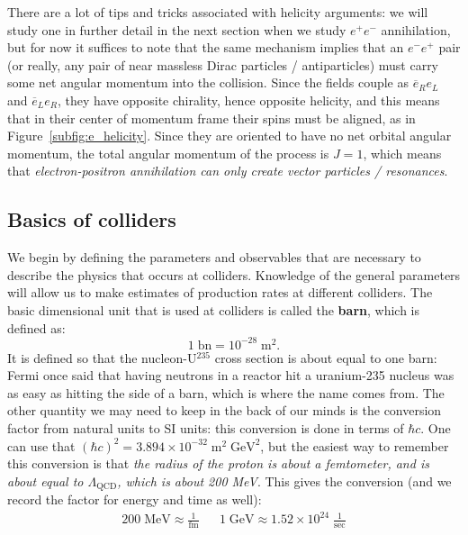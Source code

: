 \documentclass[11pt, oneside]{article}   	%
\theoremstyle{definition}
\numberwithin{equation}{subsection}		%
\begin{document}
There are a lot of tips and tricks associated with helicity arguments: we will study one in further detail in the next section when we study $e^+ e^-$ annihilation, but for now it suffices 
to note that the same mechanism implies that an $e^- e^+$ pair (or really, any pair of near massless Dirac particles / antiparticles) must carry some net angular momentum into 
the collision. Since the fields couple as $\overline e_R e_L$ and $\overline e_L e_R$, they have opposite chirality, hence opposite helicity, and this means that in their center of momentum 
frame their spins must be aligned, as in Figure~\ref{subfig:e_helicity}. Since they are oriented to have no net orbital angular momentum, the total angular momentum of the process is 
$J = 1$, which means that \textit{electron-positron annihilation can only create vector particles / resonances}. 


\subsection{Basics of colliders}

We begin by defining the parameters and observables that are necessary to describe the physics that occurs at colliders. 
Knowledge of the general parameters will allow us to make estimates of production rates at different colliders. The basic dimensional 
unit that is used at colliders is called the \textbf{barn}, which is defined as:
\begin{equation}
	1\;\mathrm{bn} = 10^{-28}\;\mathrm{m}^2.
\end{equation}
It is defined so that the nucleon-U$^{235}$ cross section is about equal to one barn: Fermi once said that having neutrons in a reactor hit 
a uranium-235 nucleus was as easy as hitting the side of a barn, which is where the name comes from. The other quantity we may need 
to keep in the back of our minds is the conversion factor from natural units to SI units: this conversion is done in terms of $\hbar c$. 
One can use that $(\hbar c)^2 = 3.894\times 10^{-32}\;\mathrm{m}^2\;\mathrm{GeV}^2$, but the easiest way to remember this conversion 
is that \textit{the radius of the proton is about a femtometer, and is about equal to $\Lambda_{\mathrm{QCD}}$, which is about 200 MeV}. This 
gives the conversion (and we record the factor for energy and time as well):
\begin{align}
	200\;\mathrm{MeV}\approx \frac{1}{\mathrm{fm}} && 1 \;\mathrm{GeV} \approx 1.52\times 10^{24}\;\frac{1}{\mathrm{sec}}
\end{align}
\end{document}
